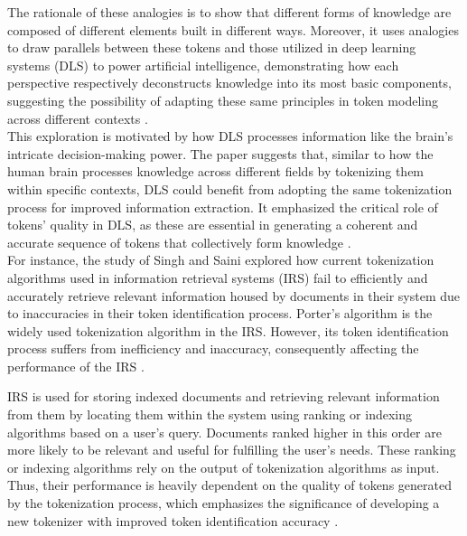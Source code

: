 \documentclass[journal]{./IEEE/IEEEtran}
\begin{document}
The rationale of these analogies is to show that different forms of knowledge are composed of different elements built in different ways. Moreover, it uses analogies to draw parallels between these tokens and those utilized in deep learning systems (DLS) to power artificial intelligence, demonstrating how each perspective respectively deconstructs knowledge into its most basic components, suggesting the possibility of adapting these same principles in token modeling across different contexts {\cite{TokenizationInKnowledge}}. \\

This exploration is motivated by how DLS processes information like the brain's intricate decision-making power. The paper suggests that, similar to how the human brain processes knowledge across different fields by tokenizing them within specific contexts, DLS could benefit from adopting the same tokenization process for improved information extraction.  It emphasized the critical role of tokens’ quality in DLS, as these are essential in generating a coherent and accurate sequence of tokens that collectively form knowledge {\cite{TokenizationInKnowledge}}. \\

For instance, the study of Singh and Saini {\cite{TokenizationForIRS}} explored how current tokenization algorithms used in information retrieval systems (IRS) fail to efficiently and accurately retrieve relevant information housed by documents in their system due to inaccuracies in their token identification process. Porter's algorithm is the widely used tokenization algorithm in the IRS. However, its token identification process suffers from inefficiency and inaccuracy, consequently affecting the performance of the IRS {\cite{TokenizationForIRS}}. \\

\newpage

IRS is used for storing indexed documents and retrieving relevant information from them by locating them within the system using ranking or indexing algorithms based on a user's query. Documents ranked higher in this order are more likely to be relevant and useful for fulfilling the user's needs. These ranking or indexing algorithms rely on the output of tokenization algorithms as input. Thus, their performance is heavily dependent on the quality of tokens generated by the tokenization process, which emphasizes the significance of developing a new tokenizer with improved token identification accuracy {\cite{TokenizationForIRS}}. \\
\end{document}
